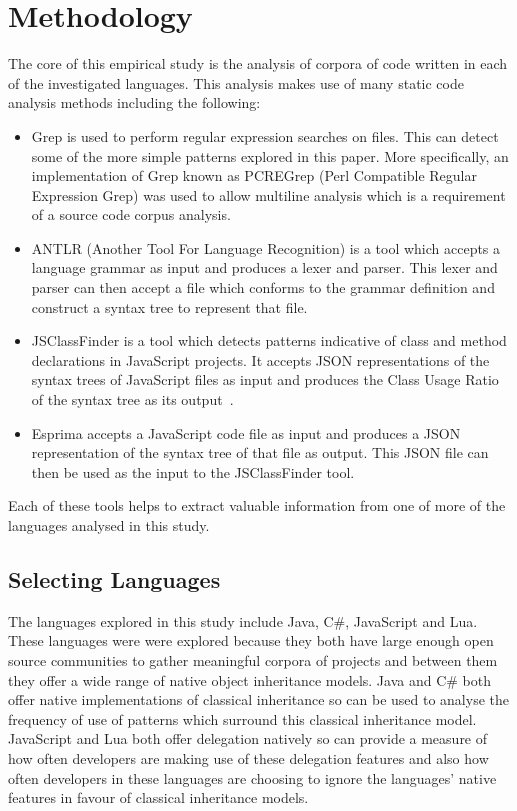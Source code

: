 \chapter{Methodology}\label{C:method} 
The core of this empirical study is the analysis of corpora of code written in each of the investigated languages. This analysis makes use of many static code analysis methods including the following:
\begin{itemize}
	\item Grep is used to perform regular expression searches on files. This can detect some of the more simple patterns explored in this paper. More specifically, an implementation of Grep known as PCREGrep (Perl Compatible Regular Expression Grep) was used to allow multiline analysis which is a requirement of a source code corpus analysis.
	\item ANTLR (Another Tool For Language Recognition) is a tool which accepts a language grammar as input and produces a lexer and parser. This lexer and parser can then accept a file which conforms to the grammar definition and construct a syntax tree to represent that file.
	\item JSClassFinder is a tool which detects patterns indicative of class and method declarations in JavaScript projects. It accepts JSON representations of the syntax trees of JavaScript files as input and produces the Class Usage Ratio of the syntax tree as its output~\cite{JSClassFinder}.
	\item Esprima accepts a JavaScript code file as input and produces a JSON representation of the syntax tree of that file as output. This JSON file can then be used as the input to the JSClassFinder tool.
\end{itemize}
Each of these tools helps to extract valuable information from one of more of the languages analysed in this study.

\section{Selecting Languages}
The languages explored in this study include Java, C\#, JavaScript and Lua. These languages were were explored because they both have large enough open source communities to gather meaningful corpora of projects and between them they offer a wide range of native object inheritance models. Java and C\# both offer native implementations of classical inheritance so can be used to analyse the frequency of use of patterns which surround this classical inheritance model. JavaScript and Lua both offer delegation natively so can provide a measure of how often developers are making use of these delegation features and also how often developers in these languages are choosing to ignore the languages' native features in favour of classical inheritance models.

